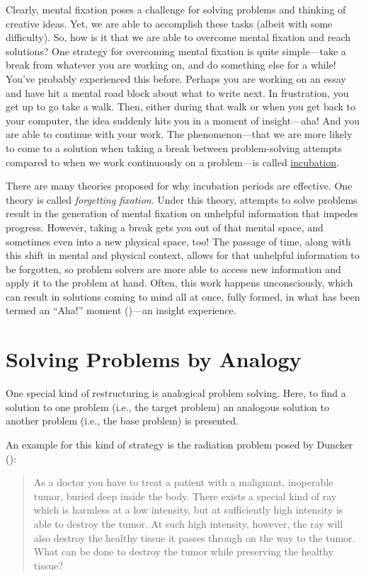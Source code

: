 \documentclass[
]{krantz}
\begin{document}
Clearly, mental fixation poses a challenge for solving problems and thinking of creative ideas. Yet, we are able to accomplish these tasks (albeit with some difficulty). So, how is it that we are able to overcome mental fixation and reach solutions? One strategy for overcoming mental fixation is quite simple---take a break from whatever you are working on, and do something else for a while! You've probably experienced this before. Perhaps you are working on an essay and have hit a mental road block about what to write next. In frustration, you get up to go take a walk. Then, either during that walk or when you get back to your computer, the idea suddenly hits you in a moment of insight---aha! And you are able to continue with your work. The phenomenon---that we are more likely to come to a solution when taking a break between problem-solving attempts compared to when we work continuously on a problem---is called \hyperref[incubation]{incubation}.

There are many theories proposed for why incubation periods are effective. One theory is called \emph{forgetting fixation}. Under this theory, attempts to solve problems result in the generation of mental fixation on unhelpful information that impedes progress. However, taking a break gets you out of that mental space, and sometimes even into a new physical space, too! The passage of time, along with this shift in mental and physical context, allows for that unhelpful information to be forgotten, so problem solvers are more able to access new information and apply it to the problem at hand. Often, this work happens unconsciously, which can result in solutions coming to mind all at once, fully formed, in what has been termed an ``Aha!'' moment ()---an insight experience.

\section{Solving Problems by Analogy}\label{solving-problems-by-analogy}

One special kind of restructuring is analogical problem solving. Here, to find a solution to one problem (i.e., the target problem) an analogous solution to another problem (i.e., the base problem) is presented.

An example for this kind of strategy is the radiation problem posed by Duncker ():

\begin{quote}
As a doctor you have to treat a patient with a malignant, inoperable tumor, buried deep inside the body. There exists a special kind of ray which is harmless at a low intensity, but at sufficiently high intensity is able to destroy the tumor. At such high intensity, however, the ray will also destroy the healthy tissue it passes through on the way to the tumor. What can be done to destroy the tumor while preserving the healthy tissue?
\end{quote}
\end{document}
